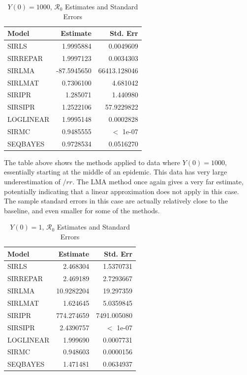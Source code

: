 \message{ !name(draft_v13.tex)}\documentclass[12pt]{article}
\newcommand{\rr}{\ensuremath{\mathcal{R}_0}}
\begin{document}
\begin{table}[H]
	
	\caption{\label{tab:}$Y(0) = 1000$, $\rr$ Estimates and Standard Errors}
	\centering
	\begin{tabular}[t]{l|r|r}
		\hline
		Model & Estimate & Std. Err\\
		\hline
		SIRLS & 1.9995884 & 0.0049609\\
		\hline
		SIRREPAR & 1.9997123 & 0.0034303\\
		\hline
		SIRLMA & -87.5945650 & 66413.128046\\
		\hline
		SIRLMAT & 0.7306100 & 4.681042\\
		\hline
		SIRIPR & 1.285071 & 1.440980\\
		\hline
		SIRSIPR & 1.2522106 & 57.9229822 \\
		\hline
		LOGLINEAR & 1.9995148 & 0.0002828\\
		\hline
		SIRMC & 0.9485555 & $<$ 1e-07\\
		\hline
		SEQBAYES & 0.9728534 & 0.0516270\\
		\hline
	\end{tabular}
\end{table}

The table above shows the methods applied to data where $Y(0) = 1000$, essentially starting at the middle of an epidemic. This data has very large underestimation of $/rr$. The LMA method once again gives a very far estimate, potentially indicating that a linear approximation does not apply in this case. The sample standard errors in this case are actually relatively close to the baseline, and even smaller for some of the methods.

\begin{table}[H]
	
	\caption{\label{tab:}$Y(0) = 1$, $\rr$ Estimates and Standard Errors}
	\centering
	\begin{tabular}[t]{l|r|r}
		\hline
		Model & Estimate & Std. Err\\
		\hline
		SIRLS & 2.468304 & 1.5370731\\
		\hline
		SIRREPAR & 2.469189 & 2.7293667\\
		\hline
		SIRLMA & 10.9282204 & 19.297359 \\
		\hline
		SIRLMAT & 1.624645 & 5.0359845\\
		\hline
		SIRIPR & 774.274659 & 7491.005080 \\
		\hline
		SIRSIPR & 2.4390757 & $<$ 1e-07 \\
		\hline
		LOGLINEAR & 1.999690 & 0.0007731\\
		\hline
		SIRMC & 0.948603 & 0.0000156\\
		\hline
		SEQBAYES & 1.471481 & 0.0634937\\
		\hline
	\end{tabular}
\end{table}
\end{document}
